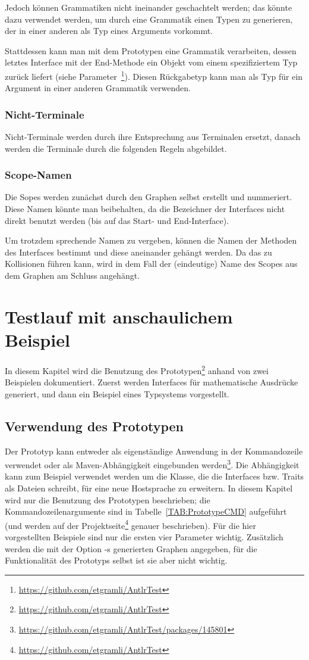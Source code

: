\documentclass[../InterneDSLs.tex]{subfiles}
\begin{document}
Jedoch können Grammatiken nicht ineinander geschachtelt werden; das könnte dazu verwendet werden, um durch eine Grammatik einen Typen zu generieren, der in einer anderen als Typ eines Arguments vorkommt.

Stattdessen kann man mit dem Prototypen eine Grammatik verarbeiten, dessen letztes Interface mit der End-Methode ein Objekt vom einem spezifiziertem Typ zurück liefert (siehe Parameter~\footnote{\url{https://github.com/etgramli/AntlrTest}}). Diesen Rückgabetyp kann man als Typ für ein Argument in einer anderen Grammatik verwenden.

\subsection{Nicht-Terminale}
Nicht-Terminale werden durch ihre Entsprechung aus Terminalen ersetzt, danach werden die Terminale durch die folgenden Regeln abgebildet.

\subsection{Scope-Namen}
Die Sopes werden zunächst durch den Graphen selbst erstellt und nummeriert. Diese Namen könnte man beibehalten, da die Bezeichner der Interfaces nicht direkt benutzt werden (bis auf das Start- und End-Interface).

Um trotzdem sprechende Namen zu vergeben, können die Namen der Methoden des Interfaces bestimmt und diese aneinander gehängt werden. Da das zu Kollisionen führen kann, wird in dem Fall der (eindeutige) Name des Scopes aus dem Graphen am Schluss angehängt.


\chapter{Testlauf mit anschaulichem Beispiel}\label{SEC:Example}
In diesem Kapitel wird die Benutzung des Prototypen\footnote{\url{https://github.com/etgramli/AntlrTest}} anhand von zwei Beispielen dokumentiert. Zuerst werden Interfaces für mathematische Ausdrücke generiert, und dann ein Beispiel eines Typsystems vorgestellt.

\section{Verwendung des Prototypen}
Der Prototyp kann entweder als eigenständige Anwendung in der Kommandozeile verwendet oder als Maven-Abhängigkeit eingebunden werden\footnote{\url{https://github.com/etgramli/AntlrTest/packages/145801}}. Die Abhängigkeit kann zum Beispiel verwendet werden um die Klasse, die die Interfaces bzw. Traits als Dateien schreibt, für eine neue Hostsprache zu erweitern. In diesem Kapitel wird nur die Benutzung des Prototypen beschrieben; die Kommandozeilenargumente sind in Tabelle~\ref{TAB:PrototypeCMD} aufgeführt (und werden auf der Projektseite\footnote{\url{https://github.com/etgramli/AntlrTest}} genauer beschrieben). Für die hier vorgestellten Beispiele sind nur die ersten vier Parameter wichtig. Zusätzlich werden die mit der Option -s generierten Graphen angegeben, für die Funktionalität des Prototyps selbst ist sie aber nicht wichtig.
\end{document}
